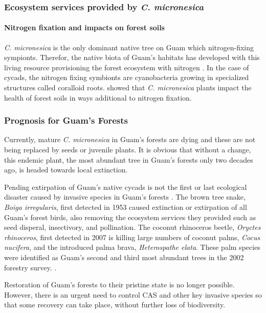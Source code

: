 \documentclass[12pt,letterpaper,english,bibliography=totocnumbered, abstract=on]{scrartcl}
\begin{document}
\subsubsection{Ecosystem services provided by \textit{C. micronesica}}

\paragraph{Nitrogen fixation and impacts on forest soils}

\textit{C. micronesica} is the only dominant native tree on Guam which nitrogen-fixing sympionts. Therefor, the native biota of Guam's habitats has developed with this living resource provisioning the forest ecosystem with nitrogen \parencite{marlerArthropodInvasionDisrupts2011}. In the case of cycads, the nitrogen fixing symbionts are cyanobacteria growing in specialized structures called coralloid roots. \cite{marlerCycasMicronesicaTrees2018b} showed that \textit{C. micronesica} plants impact the health of forest soils in ways additional to nitrogen fixation.   

\subsubsection{Prognosis for Guam's Forests} 

Currently, mature \textit{C. micronesica} in Guam's forests are dying and these are not being replaced by seeds or juvenile plants. It is obvious that without a change, this endemic plant, the most abundant tree in Guam's forests only two decades ago, is headed towards local extinction.

Pending extirpation of Guam's native cycads is not the first or last ecological disaster caused by invasive species in Guam's forests \parencite{moore_failed_2018}. The brown tree snake, \textit{Boiga irregularis}, first detected in 1953 caused extinction or extirpation of all Guam's forest birds, also removing the ecosystem services they provided such as seed disperal, insectivory, and pollination. The coconut rhinoceros beetle, \textit{Oryctes rhinoceros}, first detected in 2007 is killing large numbers of coconut palms, \textit{Cocus nucifera}, and the introduced palma brava, \textit{Heterospathe elata}. These palm species were identified as Guam's second and third most abundant trees in the 2002 forestry survey. \parencite{donnegon_guams_2004}.

Restoration of Guam's forests to their pristine state is no longer possible. However, there is an urgent need to control CAS and other key invasive species so that some recovery can take place, without further loss of biodiversity. 
\end{document}
